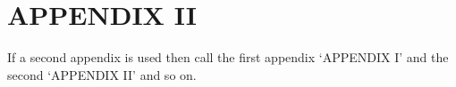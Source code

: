 \section{APPENDIX II}
If a second appendix is used then call the first appendix ‘APPENDIX I’ and the second ‘APPENDIX II’ and so on.